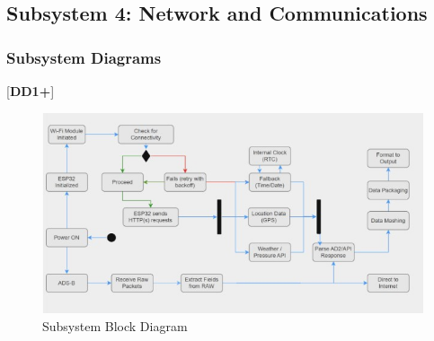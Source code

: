 \clearpage
\subsection{Subsystem 4: Network and Communications}

\subsubsection{Subsystem Diagrams}
[\textbf{DD1+}]
\begin{figure}[h]
    \centering
    \includegraphics[width=16cm]{images/Communications/SubsystemDiagram-communcations.jpg} %
    \caption{Subsystem Block Diagram}
\end{figure} %

